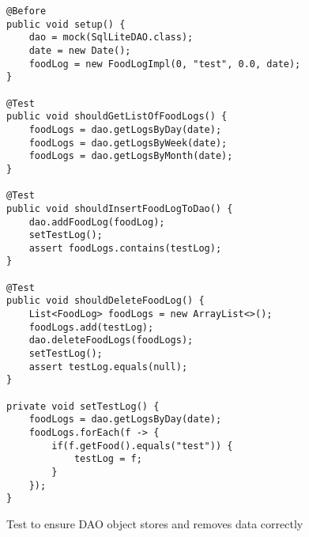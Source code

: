 \begin{figure}[h]
\caption{Test to ensure DAO object stores and removes data correctly}
\label{lst:test3}
\begin{lstlisting}[style=Java]
@Before
public void setup() {
    dao = mock(SqlLiteDAO.class);
    date = new Date();
    foodLog = new FoodLogImpl(0, "test", 0.0, date);
}

@Test
public void shouldGetListOfFoodLogs() {
    foodLogs = dao.getLogsByDay(date);
    foodLogs = dao.getLogsByWeek(date);
    foodLogs = dao.getLogsByMonth(date);
}

@Test
public void shouldInsertFoodLogToDao() {
    dao.addFoodLog(foodLog);
    setTestLog();
    assert foodLogs.contains(testLog);
}

@Test
public void shouldDeleteFoodLog() {
    List<FoodLog> foodLogs = new ArrayList<>();
    foodLogs.add(testLog);
    dao.deleteFoodLogs(foodLogs);
    setTestLog();
    assert testLog.equals(null);
}

private void setTestLog() {
    foodLogs = dao.getLogsByDay(date);
    foodLogs.forEach(f -> {
        if(f.getFood().equals("test")) {
            testLog = f;
        }
    });
}
\end{lstlisting}
\end{figure}